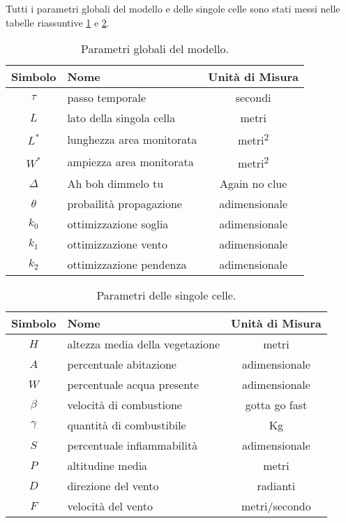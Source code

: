 \documentclass[draft]{article}
\newcommand{\combvar}{Kg}
\begin{document}
Tutti i parametri globali del modello e delle singole celle sono stati messi
nelle tabelle riassuntive \ref{tab:globals} e \ref{tab:params}.

\begin{table}
\centering
\begin{tabular}{|c|l|c|}
	\hline
	\textbf{Simbolo} & \textbf{Nome} & \textbf{Unità di Misura}\\
	\hline
	$\tau$ & passo temporale & secondi\\
	$L$ & lato della singola cella & metri\\
	$L^*$ & lunghezza area monitorata & metri\textsuperscript{2}\\
	$W^*$ & ampiezza area monitorata & metri\textsuperscript{2}\\
	$\Delta$ & Ah boh dimmelo tu & Again no clue\\
	$\theta$ & probailità propagazione & adimensionale\\
	$k_0$ & ottimizzazione soglia & adimensionale\\
	$k_1$ & ottimizzazione vento & adimensionale\\
	$k_2$ & ottimizzazione pendenza & adimensionale\\
	\hline
\end{tabular}
\caption{Parametri globali del modello.}
\label{tab:globals}
\end{table}

\begin{table}
\centering
\begin{tabular}{|c|l|c|}
	\hline
	\textbf{Simbolo} & \textbf{Nome} & \textbf{Unità di Misura}\\
	\hline
	$H$ & altezza media della vegetazione & metri\\
	$A$ & percentuale abitazione & adimensionale\\
	$W$ & percentuale acqua presente & adimensionale\\
	$\beta$ & velocità di combustione & gotta go fast\\
	$\gamma$ & quantità di combustibile & \combvar\\
	$S$ & percentuale infiammabilità & adimensionale\\
	$P$ & altitudine media & metri\\
	$D$ & direzione del vento & radianti\\
	$F$ & velocità del vento & metri/secondo\\
	\hline
\end{tabular}
\caption{Parametri delle singole celle.}
\label{tab:params}
\end{table}
\end{document}
